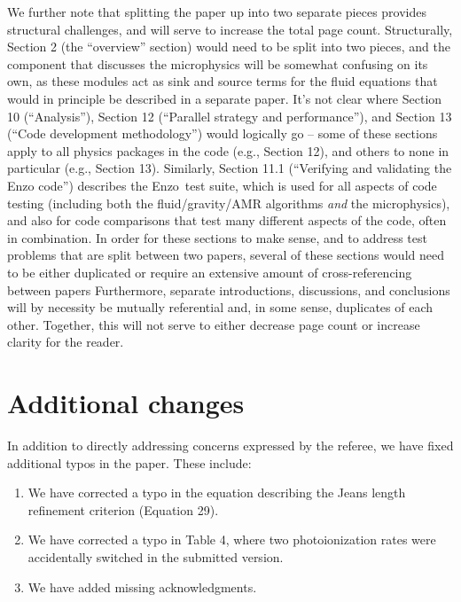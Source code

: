 \documentclass[11pt]{article}
\newcommand{\code}[1]{\textsf{#1}}
\newcommand{\enzo}{\code{Enzo}}
\begin{document}
We further note that splitting the paper up into two separate pieces
provides structural challenges, and will serve to increase the total
page count.  Structurally, Section 2 (the ``overview'' section) would
need to be split into two pieces, and the component that discusses the
microphysics will be somewhat confusing on its own, as these modules
act as sink and source terms for the fluid equations that would in
principle be described in a separate paper.  It's not clear where
Section 10 (``Analysis''), Section 12 (``Parallel strategy and
performance''), and Section 13 (``Code development methodology'')
would logically go -- some of these sections apply to all physics
packages in the code (e.g., Section 12), and others to none in
particular (e.g., Section 13).  Similarly, Section 11.1 (``Verifying
and validating the Enzo code'') describes the \enzo\ test suite, which
is used for all aspects of code testing (including both the
fluid/gravity/AMR algorithms \textit{and} the microphysics), and also
for code comparisons that test many different aspects of the code,
often in combination.  In order for these sections to make sense, and
to address test problems that are split between two papers, several of
these sections would need to be either duplicated or require an
extensive amount of cross-referencing between papers Furthermore,
separate introductions, discussions, and conclusions will by necessity
be mutually referential and, in some sense, duplicates of each other.
Together, this will not serve to either decrease page count or
increase clarity for the reader.

\section{Additional changes}

In addition to directly addressing concerns expressed by the referee,
we have fixed additional typos in the paper.  These include:

\begin{enumerate}
\item  We have corrected a typo in the equation describing the Jeans
  length refinement criterion (Equation 29).

\item We have corrected a typo in Table 4, where two photoionization
  rates were accidentally switched in the submitted version.

\item We have added missing acknowledgments.

\end{enumerate}



\newpage



\end{document}
